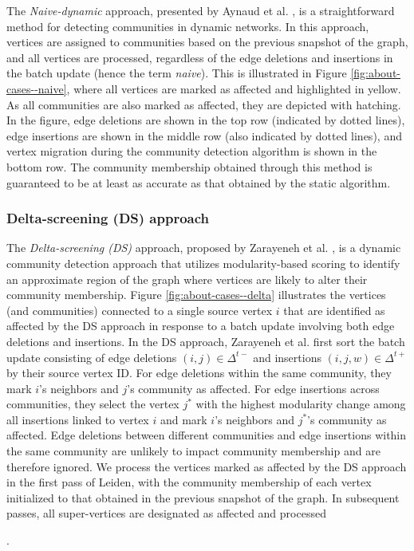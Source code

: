 The \textit{Naive-dynamic} approach, presented by Aynaud et al. \cite{com-aynaud10}, is a straightforward method for detecting communities in dynamic networks. In this approach, vertices are assigned to communities based on the previous snapshot of the graph, and all vertices are processed, regardless of the edge deletions and insertions in the batch update (hence the term \textit{naive}). This is illustrated in Figure \ref{fig:about-cases--naive}, where all vertices are marked as affected and highlighted in yellow. As all communities are also marked as affected, they are depicted with hatching. In the figure, edge deletions are shown in the top row (indicated by dotted lines), edge insertions are shown in the middle row (also indicated by dotted lines), and vertex migration during the community detection algorithm is shown in the bottom row. The community membership obtained through this method is guaranteed to be at least as accurate as that obtained by the static algorithm.


\subsubsection{Delta-screening (DS) approach}
\label{sec:delta-screening}

The \textit{Delta-screening (DS)} approach, proposed by Zarayeneh et al. \cite{com-zarayeneh21}, is a dynamic community detection approach that utilizes modularity-based scoring to identify an approximate region of the graph where vertices are likely to alter their community membership. Figure \ref{fig:about-cases--delta} illustrates the vertices (and communities) connected to a single source vertex $i$ that are identified as affected by the DS approach in response to a batch update involving both edge deletions and insertions. In the DS approach, Zarayeneh et al. first sort the batch update consisting of edge deletions $(i, j) \in \Delta^{t-}$ and insertions $(i, j, w) \in \Delta^{t+}$ by their source vertex ID. For edge deletions within the same community, they mark $i$'s neighbors and $j$'s community as affected. For edge insertions across communities, they select the vertex $j^*$ with the highest modularity change among all insertions linked to vertex $i$ and mark $i$'s neighbors and $j^*$'s community as affected. Edge deletions between different communities and edge insertions within the same community are unlikely to impact community membership and are therefore ignored. We process the vertices marked as affected by the DS approach in the first pass of Leiden, with the community membership of each vertex initialized to that obtained in the previous snapshot of the graph. In subsequent passes, all super-vertices are designated as affected and processed.


